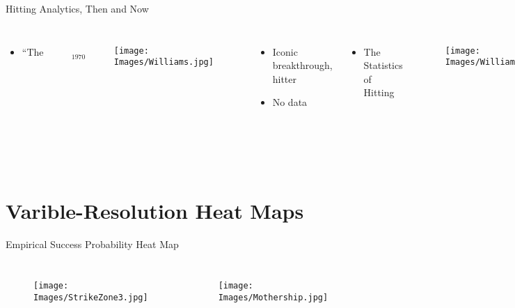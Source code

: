 \documentclass{beamer}
\begin{document}
\begin{frame}{Hitting Analytics, Then and Now} %
\begin{columns}
\begin{itemize}
\item $\text{``The Science of Hitting''}_{\text{1970}}$
\end{itemize}

        \begin{figure}[H]
      	\centering
      	\texttt{[image: Images/Williams.jpg]}
      	\end{figure}
      
\begin{itemize}
\item Iconic breakthrough, hitter
\item No data
\end{itemize}

\begin{itemize}
\item The Statistics of Hitting
\end{itemize}
  \begin{figure}[H]
	\centering
	\texttt{[image: Images/WilliamsMother.jpg]}
	\end{figure}
\begin{itemize}
\item PITCHf/x data, R, heat maps
\item SGLMMs, Stan, PPMs, INLA
\end{itemize}

\end{columns}
\end{frame}

\section{Varible-Resolution Heat Maps}

\begin{frame}{Empirical Success Probability Heat Map} %
\begin{columns}


  \begin{figure}[H]
	\centering
	\texttt{[image: Images/StrikeZone3.jpg]} 
	\end{figure}

  \begin{figure}[H]
	\centering
	\texttt{[image: Images/Mothership.jpg]} 
	\end{figure}
	
\end{columns}
\end{frame}
\end{document}
